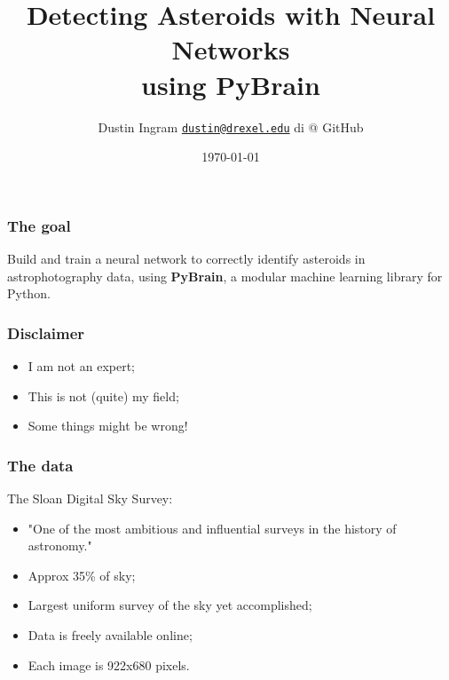 \documentclass{beamer}
\title{Detecting Asteroids with Neural Networks\\ using PyBrain}
\author{
    \texorpdfstring{
        Dustin Ingram\newline
        \texttt{\href{mailto:dustin@drexel.edu}{dustin@drexel.edu}}\newline
        di @ GitHub
    }{Author}
}
\institute{Philly Python Users Group}
\date{\today}
\begin{document}
\maketitle

\begin{frame}
    \frametitle{The goal}
    Build and train a neural network to correctly identify asteroids in
    astrophotography data, using \textbf{PyBrain}, a modular machine learning
    library for Python.
\end{frame}

\begin{frame}
    \frametitle{Disclaimer}
    \begin{itemize}
        \item I am not an expert;
        \item This is not (quite) my field;
        \item Some things might be wrong!
    \end{itemize}
\end{frame}

\begin{frame}
    \frametitle{The data}
    The Sloan Digital Sky Survey:
    \begin{itemize}
        \item "One of the most ambitious and influential surveys in the history
        of astronomy."
        \item Approx 35\% of sky;
        \item Largest uniform survey of the sky yet accomplished;
        \item Data is freely available online;
        \item Each image is 922x680 pixels.
    \end{itemize}
\end{frame}

{
    \begin{frame}[plain] \end{frame}
}
\end{document}
